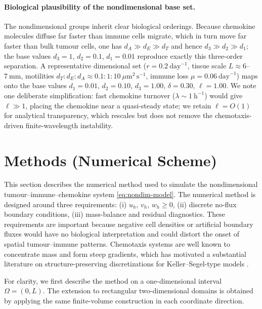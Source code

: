 \documentclass[a4paper,fleqn,longmktitle]{cas-sc}
\theoremstyle{plain}
\theoremstyle{definition}
\numberwithin{equation}{section}
\begin{document}
\paragraph{Biological plausibility of the nondimensional base set.}
The nondimensional groups inherit clear biological orderings. Because chemokine molecules diffuse far faster than immune cells migrate, which in turn move far faster than bulk tumour cells, one has $d_A \gg d_E \gg d_T$ and hence $d_3 \gg d_2 \gg d_1$; the base values $d_3=1$, $d_2=0.1$, $d_1=0.01$ reproduce exactly this three-order separation. A representative dimensional set ($r=0.2\ \mathrm{day}^{-1}$, tissue scale $L\approx 6$--$7\ \mathrm{mm}$, motilities $d_T:d_E:d_A \approx 0.1:1:10\ \mu\mathrm{m}^2\,\mathrm{s}^{-1}$, immune loss $\mu=0.06\ \mathrm{day}^{-1}$) maps onto the base values $d_1=0.01$, $d_2=0.10$, $d_3=1.00$, $\delta=0.30$, $\ell=1.00$. We note one deliberate simplification: fast chemokine turnover ($\lambda\sim 1\ \mathrm{h}^{-1}$) would give $\ell\gg 1$, placing the chemokine near a quasi-steady state; we retain $\ell=O(1)$ for analytical transparency, which rescales but does not remove the chemotaxis-driven finite-wavelength instability.

\section{Methods (Numerical Scheme)}
\label{sec:numerical-method}

This section describes the numerical method used to simulate the nondimensional tumour--immune--chemokine system \eqref{eq:nondim-model}.
The numerical method is designed around three requirements: 
(i) $u_h$, $v_h$, $w_h\ge0$, (ii) discrete no-flux boundary conditions,
(iii) mass-balance and residual diagnostics.
These requirements are important because negative cell densities or artificial
boundary fluxes would have no biological interpretation and could distort the
onset of spatial tumour--immune patterns. Chemotaxis systems are well known to
concentrate mass and form steep gradients, which has motivated a substantial
literature on structure-preserving discretizations for Keller--Segel-type models
\cite{filbet2006finite,chertock2008second,yu2026fullcovariance,saito2007conservative}.

For clarity, we first describe the method on a one-dimensional interval
\(\Omega=(0,L)\). The extension to rectangular two-dimensional domains is
obtained by applying the same finite-volume construction in each coordinate
direction.
\end{document}
